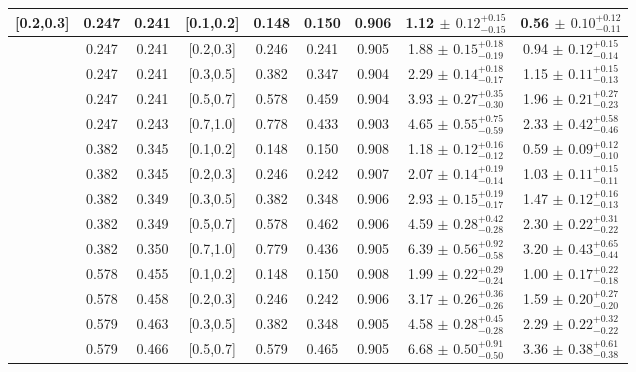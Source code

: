 \begin{table}[H]
\begin{tabular}{|c|c|c|c|c|c|c|c|c|}
[0.2,0.3]	&	0.247	&	0.241	&	[0.1,0.2]	&	0.148	&	0.150	&	0.906	&	1.12	$\pm$ $	0.12	_{	-0.15	}^{+	0.15	}$&	0.56	$\pm$ $	0.10	_{	-0.11	}^{+	0.12	}$\\ \hline
[0.2,0.3]	&	0.247	&	0.241	&	[0.2,0.3]	&	0.246	&	0.241	&	0.905	&	1.88	$\pm$ $	0.15	_{	-0.19	}^{+	0.18	}$&	0.94	$\pm$ $	0.12	_{	-0.14	}^{+	0.15	}$\\ \hline
[0.2,0.3]	&	0.247	&	0.241	&	[0.3,0.5]	&	0.382	&	0.347	&	0.904	&	2.29	$\pm$ $	0.14	_{	-0.17	}^{+	0.18	}$&	1.15	$\pm$ $	0.11	_{	-0.13	}^{+	0.15	}$\\ \hline
[0.2,0.3]	&	0.247	&	0.241	&	[0.5,0.7]	&	0.578	&	0.459	&	0.904	&	3.93	$\pm$ $	0.27	_{	-0.30	}^{+	0.35	}$&	1.96	$\pm$ $	0.21	_{	-0.23	}^{+	0.27	}$\\ \hline
[0.2,0.3]	&	0.247	&	0.243	&	[0.7,1.0]	&	0.778	&	0.433	&	0.903	&	4.65	$\pm$ $	0.55	_{	-0.59	}^{+	0.75	}$&	2.33	$\pm$ $	0.42	_{	-0.46	}^{+	0.58	}$\\ \hline
[0.3,0.5]	&	0.382	&	0.345	&	[0.1,0.2]	&	0.148	&	0.150	&	0.908	&	1.18	$\pm$ $	0.12	_{	-0.12	}^{+	0.16	}$&	0.59	$\pm$ $	0.09	_{	-0.10	}^{+	0.12	}$\\ \hline
[0.3,0.5]	&	0.382	&	0.345	&	[0.2,0.3]	&	0.246	&	0.242	&	0.907	&	2.07	$\pm$ $	0.14	_{	-0.14	}^{+	0.19	}$&	1.03	$\pm$ $	0.11	_{	-0.11	}^{+	0.15	}$\\ \hline
[0.3,0.5]	&	0.382	&	0.349	&	[0.3,0.5]	&	0.382	&	0.348	&	0.906	&	2.93	$\pm$ $	0.15	_{	-0.17	}^{+	0.19	}$&	1.47	$\pm$ $	0.12	_{	-0.13	}^{+	0.16	}$\\ \hline
[0.3,0.5]	&	0.382	&	0.349	&	[0.5,0.7]	&	0.578	&	0.462	&	0.906	&	4.59	$\pm$ $	0.28	_{	-0.28	}^{+	0.42	}$&	2.30	$\pm$ $	0.22	_{	-0.22	}^{+	0.31	}$\\ \hline
[0.3,0.5]	&	0.382	&	0.350	&	[0.7,1.0]	&	0.779	&	0.436	&	0.905	&	6.39	$\pm$ $	0.56	_{	-0.58	}^{+	0.92	}$&	3.20	$\pm$ $	0.43	_{	-0.44	}^{+	0.65	}$\\ \hline
[0.5,0.7]	&	0.578	&	0.455	&	[0.1,0.2]	&	0.148	&	0.150	&	0.908	&	1.99	$\pm$ $	0.22	_{	-0.24	}^{+	0.29	}$&	1.00	$\pm$ $	0.17	_{	-0.18	}^{+	0.22	}$\\ \hline
[0.5,0.7]	&	0.578	&	0.458	&	[0.2,0.3]	&	0.246	&	0.242	&	0.906	&	3.17	$\pm$ $	0.26	_{	-0.26	}^{+	0.36	}$&	1.59	$\pm$ $	0.20	_{	-0.20	}^{+	0.27	}$\\ \hline
[0.5,0.7]	&	0.579	&	0.463	&	[0.3,0.5]	&	0.382	&	0.348	&	0.905	&	4.58	$\pm$ $	0.28	_{	-0.28	}^{+	0.45	}$&	2.29	$\pm$ $	0.22	_{	-0.22	}^{+	0.32	}$\\ \hline
[0.5,0.7]	&	0.579	&	0.466	&	[0.5,0.7]	&	0.579	&	0.465	&	0.905	&	6.68	$\pm$ $	0.50	_{	-0.50	}^{+	0.91	}$&	3.36	$\pm$ $	0.38	_{	-0.38	}^{+	0.61	}$\\ \hline

\end{tabular}
\end{table}

